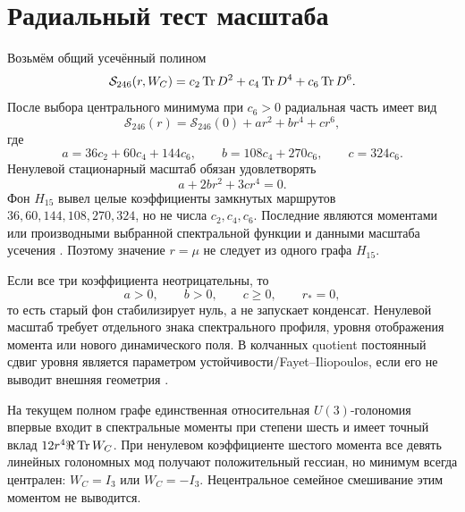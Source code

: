 \section{Радиальный тест масштаба}

Возьмём общий усечённый полином
\begin{equation}
 \mathcal S_{246}(r,W_C)
 =c_2\operatorname{Tr} D^2+c_4\operatorname{Tr} D^4+c_6\operatorname{Tr} D^6.
 \label{eq:v7-cycle-moment-spectral-polynomial}
\end{equation}
После выбора центрального минимума при $c_6>0$ радиальная часть имеет вид
\begin{equation}
 \mathcal S_{246}(r)=\mathcal S_{246}(0)
 +ar^2+br^4+cr^6,
 \label{eq:v7-cycle-moment-radial-polynomial}
\end{equation}
где
\begin{equation}
 a=36c_2+60c_4+144c_6,\qquad
 b=108c_4+270c_6,\qquad
 c=324c_6.
 \label{eq:v7-cycle-moment-radial-coefficients}
\end{equation}
Ненулевой стационарный масштаб обязан удовлетворять
\begin{equation}
 a+2br^2+3cr^4=0.
 \label{eq:v7-cycle-moment-scale-equation}
\end{equation}
Фон $H_{15}$ вывел целые коэффициенты замкнутых маршрутов
$36,60,144,108,270,324$, но не числа $c_2,c_4,c_6$. Последние являются
моментами или производными выбранной спектральной функции и данными масштаба
усечения \cite{v7-cycle-moment-spectral-action}. Поэтому значение $r=\mu$
не следует из одного графа $H_{15}$.

Если все три коэффициента неотрицательны, то
\begin{equation}
 a>0,\qquad b>0,\qquad c\ge0,\qquad r_*=0,
 \label{eq:v7-cycle-moment-positive-profile-origin}
\end{equation}
то есть старый фон стабилизирует нуль, а не запускает конденсат. Ненулевой
масштаб требует отдельного знака спектрального профиля, уровня отображения
момента или нового динамического поля. В колчанных quotient постоянный сдвиг
уровня является параметром устойчивости/Fayet--Iliopoulos, если его не
выводит внешняя геометрия \cite{v7-cycle-moment-fi}.

\begin{theorem}
На текущем полном графе единственная относительная $U(3)$-голономия впервые
входит в спектральные моменты при степени шесть и имеет точный вклад
$12r^4\Re\operatorname{Tr} W_C$. При ненулевом коэффициенте шестого момента все девять
линейных голономных мод получают положительный гессиан, но минимум всегда
централен: $W_C=I_3$ или $W_C=-I_3$. Нецентральное семейное смешивание этим
моментом не выводится.
\end{theorem}

